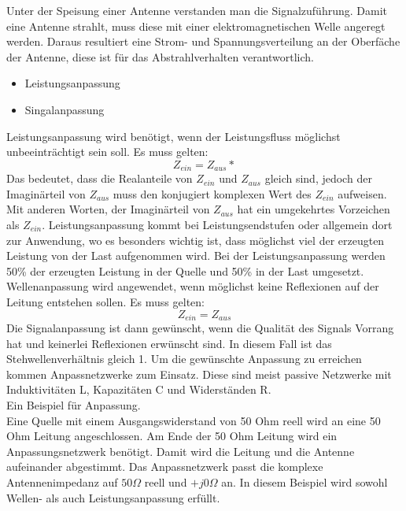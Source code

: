 Unter der Speisung einer Antenne verstanden man die Signalzuführung. Damit eine Antenne strahlt, muss diese mit einer elektromagnetischen Welle angeregt werden. Daraus resultiert eine Strom- und Spannungsverteilung an der Oberfäche der Antenne, diese ist für das Abstrahlverhalten verantwortlich. 
\begin{itemize}
\item 	Leistungsanpassung
\item 	Singalanpassung
\end{itemize}
Leistungsanpassung wird benötigt, wenn der Leistungsfluss möglichst unbeeinträchtigt sein soll. Es muss gelten:
\[Z_{ein}=Z_{aus}*\]
Das bedeutet, dass die Realanteile von $Z_{ein}$ und $Z_{aus}$ gleich sind, jedoch der Imaginärteil von $Z_{aus}$ muss den konjugiert komplexen Wert des $Z_{ein}$ aufweisen. Mit anderen Worten, der Imaginärteil von $Z_{aus}$ hat ein umgekehrtes Vorzeichen als $Z_{ein}$. Leistungsanpassung kommt bei Leistungsendstufen oder allgemein dort zur Anwendung, wo es besonders wichtig ist, dass möglichst viel der erzeugten Leistung von der Last aufgenommen wird. Bei der Leistungsanpassung werden 50\% der erzeugten Leistung in der Quelle und 50\% in der Last umgesetzt.
Wellenanpassung wird angewendet, wenn möglichst keine Reflexionen auf der Leitung entstehen sollen. Es muss gelten:
\[Z_{ein}=Z_{aus}\]
Die Signalanpassung ist dann gewünscht, wenn die Qualität des Signals Vorrang hat und keinerlei Reflexionen erwünscht sind. In diesem Fall ist das Stehwellenverhältnis gleich 1.
Um die gewünschte Anpassung zu erreichen kommen Anpassnetzwerke zum Einsatz. Diese sind meist passive Netzwerke mit Induktivitäten L, Kapazitäten C und Widerständen R.\\
Ein Beispiel für Anpassung.\\
Eine Quelle mit einem Ausgangswiderstand von 50 Ohm reell wird an eine 50 Ohm Leitung angeschlossen. Am Ende der 50 Ohm Leitung wird ein Anpassungsnetzwerk benötigt. Damit wird die Leitung und die Antenne aufeinander abgestimmt. Das Anpassnetzwerk passt die komplexe Antennenimpedanz auf $50\Omega$ reell und $+j0\Omega$ an. In diesem Beispiel wird sowohl Wellen- als auch Leistungsanpassung erfüllt.\\


